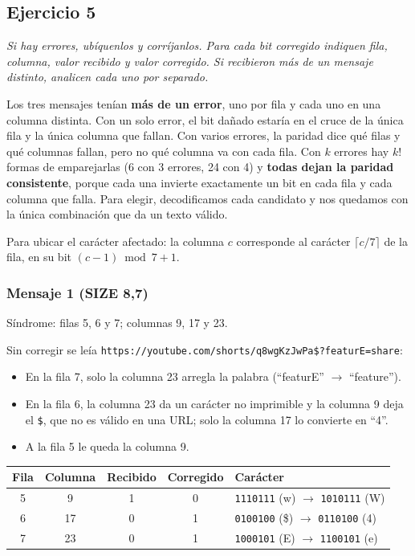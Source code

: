 \documentclass[11pt,a4paper]{article}
\begin{document}
\subsection*{Ejercicio 5}

\textit{Si hay errores, ubíquenlos y corríjanlos. Para cada bit corregido indiquen fila, columna, valor recibido y valor corregido. Si recibieron más de un mensaje distinto, analicen cada uno por separado.}

\medskip

Los tres mensajes tenían \textbf{más de un error}, uno por fila y cada uno en una columna distinta. Con un solo error, el bit dañado estaría en el cruce de la única fila y la única columna que fallan. Con varios errores, la paridad dice qué filas y qué columnas fallan, pero no qué columna va con cada fila. Con $k$ errores hay $k!$ formas de emparejarlas (6 con 3 errores, 24 con 4) y \textbf{todas dejan la paridad consistente}, porque cada una invierte exactamente un bit en cada fila y cada columna que falla. Para elegir, decodificamos cada candidato y nos quedamos con la única combinación que da un texto válido.

Para ubicar el carácter afectado: la columna $c$ corresponde al carácter $\lceil c/7 \rceil$ de la fila, en su bit $(c-1) \bmod 7 + 1$.

\subsubsection*{Mensaje 1 (SIZE 8,7)}

Síndrome: filas 5, 6 y 7; columnas 9, 17 y 23.

Sin corregir se leía \texttt{https://youtube.com/shorts/q8wgKzJwPa\$?featurE=share}:
\begin{itemize}
  \item En la fila 7, solo la columna 23 arregla la palabra (``featurE'' $\rightarrow$ ``feature'').
  \item En la fila 6, la columna 23 da un carácter no imprimible y la columna 9 deja el \texttt{\$}, que no es válido en una URL; solo la columna 17 lo convierte en ``4''.
  \item A la fila 5 le queda la columna 9.
\end{itemize}

\begin{center}
\begin{tabular}{|c|c|c|c|l|}
\hline
\textbf{Fila} & \textbf{Columna} & \textbf{Recibido} & \textbf{Corregido} & \textbf{Carácter} \\
\hline
5 & 9 & 1 & 0 & \texttt{1110111} (w) $\rightarrow$ \texttt{1010111} (W) \\
6 & 17 & 0 & 1 & \texttt{0100100} (\$) $\rightarrow$ \texttt{0110100} (4) \\
7 & 23 & 0 & 1 & \texttt{1000101} (E) $\rightarrow$ \texttt{1100101} (e) \\
\hline
\end{tabular}
\end{center}
\end{document}
